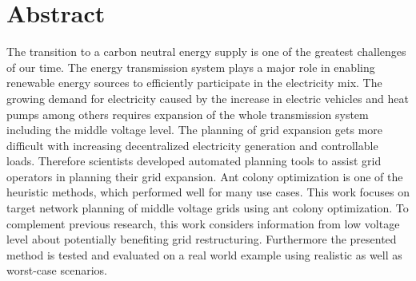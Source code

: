 \chapter*{Abstract}
The transition to a carbon neutral energy supply is one of the greatest challenges of our time. The energy transmission system plays a major role in enabling renewable energy sources to efficiently participate in the electricity mix. The growing demand for electricity caused by the increase in electric vehicles and heat pumps among others requires expansion of the whole transmission system including the middle voltage level. The planning of grid expansion gets more difficult with increasing decentralized electricity generation and controllable loads. Therefore scientists developed automated planning tools to assist grid operators in planning their grid expansion. Ant colony optimization is one of the heuristic methods, which performed well for many use cases. This work focuses on target network planning of middle voltage grids using ant colony optimization. To complement previous research, this work considers information from low voltage level about potentially benefiting grid restructuring. Furthermore the presented method is tested and evaluated on a real world example using realistic as well as worst-case scenarios.